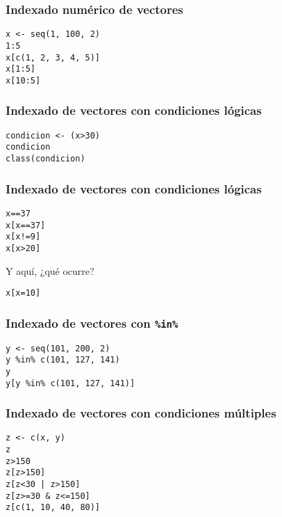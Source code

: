 \documentclass[xcolor={usenames,svgnames,dvipsnames}]{beamer}
\begin{document}
\begin{frame}[fragile]
\frametitle{Indexado numérico de vectores}
\label{sec-2-1-7}



\lstset{language=R}
\begin{lstlisting}
x <- seq(1, 100, 2)
1:5
x[c(1, 2, 3, 4, 5)]
x[1:5]
x[10:5]
\end{lstlisting}
\end{frame}
\begin{frame}[fragile]
\frametitle{Indexado de vectores con condiciones lógicas}
\label{sec-2-1-8}


\lstset{language=R}
\begin{lstlisting}
condicion <- (x>30)
condicion
class(condicion)
\end{lstlisting}
\end{frame}
\begin{frame}[fragile]
\frametitle{Indexado de vectores con condiciones lógicas}
\label{sec-2-1-9}



\lstset{language=R}
\begin{lstlisting}
x==37
x[x==37]
x[x!=9]
x[x>20]
\end{lstlisting}
\begin{block}{Y aquí, ¿qué ocurre?}
\label{sec-2-1-9-1}



\lstset{language=R}
\begin{lstlisting}
x[x=10]
\end{lstlisting}
     
\end{block}
\end{frame}
\begin{frame}[fragile]
\frametitle{Indexado de vectores con \texttt{\%in\%}}
\label{sec-2-1-10}


\lstset{language=R}
\begin{lstlisting}
y <- seq(101, 200, 2)
y %in% c(101, 127, 141)
y
y[y %in% c(101, 127, 141)]
\end{lstlisting}
\end{frame}
\begin{frame}[fragile]
\frametitle{Indexado de vectores con condiciones múltiples}
\label{sec-2-1-11}



\lstset{language=R}
\begin{lstlisting}
z <- c(x, y)
z
z>150
z[z>150]
z[z<30 | z>150]
z[z>=30 & z<=150]
z[c(1, 10, 40, 80)]
\end{lstlisting}
\end{frame}
\end{document}
